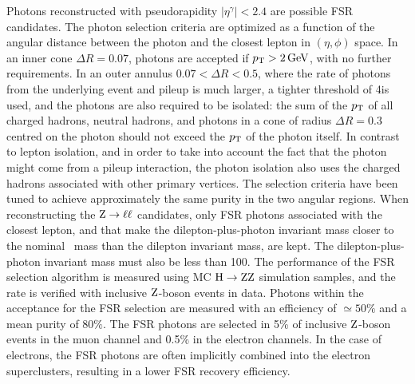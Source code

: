 \documentclass[12pt,twoside,a4paper,cmspaper,final,collab]{cms-tdr}
\begin{document}
Photons reconstructed with pseudorapidity  $\vert \eta^{\gamma} \vert < 2.4$ are possible FSR candidates.
The photon selection criteria are optimized as a function of the angular
distance between the photon and the closest lepton in $(\eta, \phi)$ space.
In an inner cone $\Delta R = 0.07$, photons are accepted if $p_{\mathrm{T}} > 2\,\text{Ge\hspace{-.08em}V}$,
with no further requirements. In an outer annulus $0.07< \Delta R<0.5$, where
the rate of photons from the underlying event and pileup
is much larger, a tighter threshold of 4\GeV is used, and the photons are also required to be isolated:
the sum of the $p_{\mathrm{T}} $ of all charged hadrons, neutral hadrons,
and photons in a cone of radius $\Delta R = 0.3$ centred on the photon should not exceed the $p_{\mathrm{T}} $
of the photon itself.
In contrast to lepton isolation,  and in order to take into account the fact that the photon might come
from a pileup interaction, the photon isolation also uses the charged hadrons associated with other
primary vertices.
The selection criteria have been tuned to achieve approximately the same purity in the two angular regions.
When reconstructing the $\mathrm{Z} \to \ell\ell $ candidates, only FSR photons associated with the closest
lepton, and that make the dilepton-plus-photon invariant mass closer to the nominal
\cPZ\ mass than the dilepton invariant mass, are kept. The dilepton-plus-photon invariant mass must also be less
than 100\GeV.
The performance of the FSR selection algorithm is measured using
MC $\mathrm{H} \to \mathrm{Z}\mathrm{Z} $  simulation samples, and the rate is verified
with inclusive $\mathrm{Z}$-boson  events in data.
Photons within the acceptance for the FSR selection are measured with an
efficiency of ${\simeq}50\%$ and a mean purity of $80\%$.
The FSR photons are selected in 5\% of  inclusive $\mathrm{Z}$-boson events
in the muon channel
and 0.5\% in the electron channels. In the case of electrons,
the FSR photons are often implicitly combined into the electron
superclusters, resulting in a lower FSR recovery efficiency.
\end{document}
